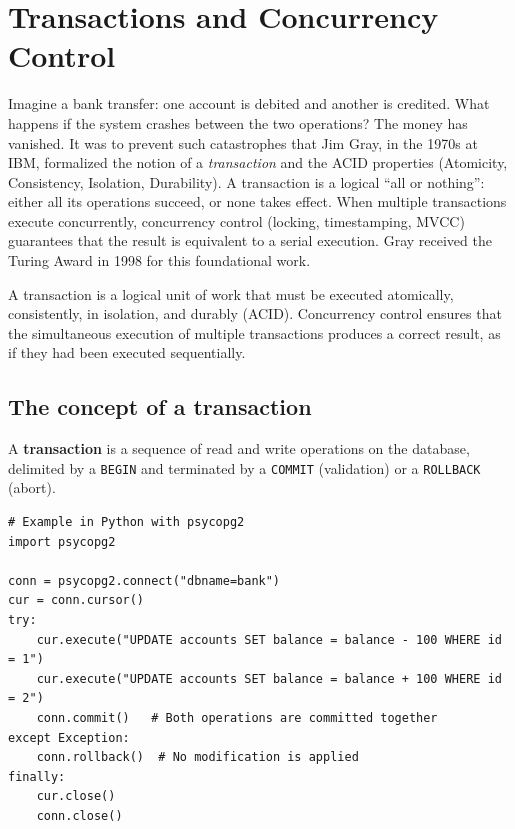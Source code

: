 \chapter{Transactions and Concurrency Control}
\label{ch:transactions}

Imagine a bank transfer: one account is debited and another is credited. What happens if the system crashes between the two operations? The money has vanished. It was to prevent such catastrophes that Jim Gray, in the 1970s at IBM, formalized the notion of a \emph{transaction} and the ACID properties (Atomicity, Consistency, Isolation, Durability). A transaction is a logical ``all or nothing'': either all its operations succeed, or none takes effect. When multiple transactions execute concurrently, concurrency control (locking, timestamping, MVCC) guarantees that the result is equivalent to a serial execution. Gray received the Turing Award in 1998 for this foundational work.

\begin{intuition}[title=\textbf{Central idea}]
A transaction is a logical unit of work that must be executed atomically,
consistently, in isolation, and durably (ACID). Concurrency control ensures
that the simultaneous execution of multiple transactions produces a correct
result, as if they had been executed sequentially.
\end{intuition}

\section{The concept of a transaction}

\begin{definition}[Transaction]
A \textbf{transaction} is a sequence of read and write operations on the
database, delimited by a \texttt{BEGIN} and terminated by a \texttt{COMMIT}
(validation) or a \texttt{ROLLBACK} (abort).
\end{definition}

\begin{verbatim}
# Example in Python with psycopg2
import psycopg2

conn = psycopg2.connect("dbname=bank")
cur = conn.cursor()
try:
    cur.execute("UPDATE accounts SET balance = balance - 100 WHERE id = 1")
    cur.execute("UPDATE accounts SET balance = balance + 100 WHERE id = 2")
    conn.commit()   # Both operations are committed together
except Exception:
    conn.rollback()  # No modification is applied
finally:
    cur.close()
    conn.close()
\end{verbatim}

